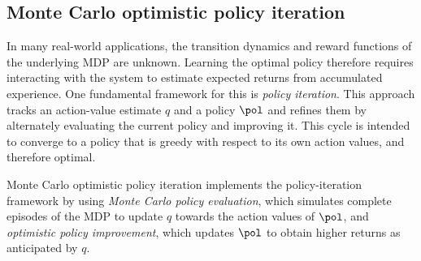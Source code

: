 


\subsection{Monte Carlo optimistic policy iteration}

In many real-world applications, the transition dynamics and reward functions of the underlying MDP are unknown. Learning the optimal policy therefore requires interacting with the system to estimate expected returns from accumulated experience.
One fundamental framework for this is \textit{policy iteration}.
This approach tracks an action-value estimate $q$ and a policy $\pol$ and refines them by alternately evaluating the current policy and improving it.
This cycle is intended to converge to a policy that is greedy with respect to its own action values, and therefore optimal.


Monte Carlo optimistic policy iteration implements the policy-iteration framework by using 
\textit{Monte Carlo policy evaluation}, which simulates complete episodes of the MDP to update $q$ towards the action values of $\pol$,
and \textit{optimistic policy improvement}, which updates $\pol$ to obtain higher returns as anticipated by $q$.


